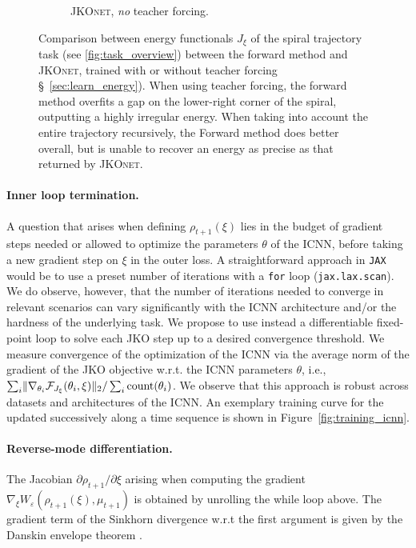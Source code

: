 \begin{figure}[t]
\begin{subfigure}[t]{0.24\textwidth}
         \caption{\textsc{JKOnet}, \protect\newline \emph{no} teacher forcing.}
     \end{subfigure}
	 \caption{Comparison between energy functionals $J_\xi$ of the spiral trajectory task (see \ref{fig:task_overview}) between the forward method and \textsc{JKOnet}, trained with or without teacher forcing \S~\ref{sec:learn_energy}). When using teacher forcing, the forward method overfits a gap on the lower-right corner of the spiral, outputting a highly irregular energy. When taking into account the entire trajectory recursively, the Forward method does better overall, but is unable to recover an energy as precise as that returned by \textsc{JKOnet}.}
	 \label{fig:exp_comp_spiral}
\end{figure}


\paragraph{Inner loop termination.} A question that arises when defining $\rho_{t+1}(\xi)$ lies in the budget of gradient steps needed or allowed to optimize the parameters $\theta$ of the ICNN, before taking a new gradient step on $\xi$ in the outer loss. A straightforward approach in \texttt{JAX} \citep{jax2018github} would be to use a preset number of iterations with a \texttt{for} loop (\texttt{jax.lax.scan}). 
We do observe, however, that the number of iterations needed to converge in relevant scenarios can vary significantly with the ICNN architecture and/or the hardness of the underlying task.
We propose to use instead a differentiable fixed-point loop to solve each \acrshort{JKO} step up to a desired convergence threshold.
We measure convergence of the optimization of the ICNN via the average norm of the gradient of the \acrshort{JKO} objective w.r.t. the ICNN parameters $\theta$, i.e., $\sum_i \lVert\nabla_{\theta_i}\mathcal{F}_{J_\xi}(\theta_i, \xi)\rVert_2/\sum_i \text{count}(\theta_i)$.
We observe that this approach is robust across datasets and architectures of the ICNN. An exemplary training curve for the  updated successively along a time sequence is shown in Figure~\ref{fig:training_icnn}.

\paragraph{Reverse-mode differentiation.} The Jacobian $\partial \rho_{t+1} / \partial\xi$ arising when computing the gradient $\nabla_\xi W_\varepsilon(\rho_{t+1}(\xi), \mu_{t+1})$ is obtained by unrolling the while loop above. The gradient term of the Sinkhorn divergence w.r.t the first argument is given by the Danskin envelope theorem \citep{danskin2012theory}.

